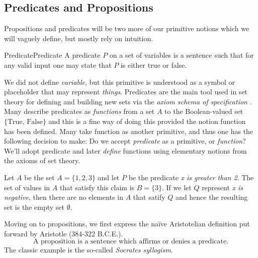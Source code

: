     \subsection{Predicates and Propositions}
        Propositions and predicates will be two more of our primitive notions
        which we will vaguely define, but mostly rely on intuition.
        \begin{fdefinition}{Predicate}{Predicate}
            A \gls{predicate} $P$ on a \gls{set} of variables is a sentence
            such that for any valid input one may state that $P$ is either true
            or false.
        \end{fdefinition}
        We did not define \textit{variable}, but this primitive
        is understood as a symbol or placeholder that may represent
        \textit{things}. Predicates are the main tool used in set theory for
        defining and building new sets via the
        \textit{axiom schema of specification}%
        . Many describe predicates as
        \textit{functions} from a set $A$ to the Boolean-valued set
        $\{\text{True},\,\text{False}\}$ and this is a fine way of doing this
        provided the notion function has been defined. Many take function as
        another primitive, and thus one has the following decision to make: Do
        we accept \textit{predicate} as a primitive, or \textit{function}? We'll
        adopt predicate and later \textit{define} functions using elementary
        notions from the axioms of set theory.
        \begin{example}
            Let $A$ be the set $A=\{1,2,3\}$ and let $P$ be the predicate
            \textit{x is greater than 2}. The set of values in $A$ that satisfy
            this claim is $B=\{3\}$. If we let $Q$ represent
            \textit{x is negative}, then there are no elements in $A$ that
            satify $Q$ and hence the resulting set is the empty set $\emptyset$.
        \end{example}
        Moving on to propositions, we first express the na\"{i}ve Aristotelian
        definition put forward by Aristotle (384-322 B.C.E.).
        \begin{equation}
            \text{A proposition is a sentence which affirms or denies a }
            \text{predicate.}
        \end{equation}
        The classic example is the so-called
        \textit{Socrates syllogism}.
